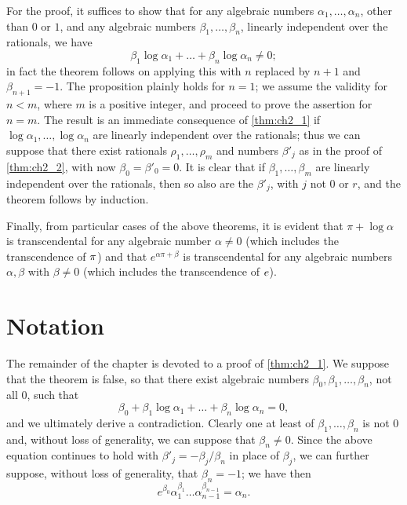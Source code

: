 For the proof, it suffices to show that for any algebraic numbers $\alpha_1, \dots, \alpha_n$, other than $0$ or $1$, and any algebraic numbers $\beta_1, \dots, \beta_n$, linearly independent over the rationals, we have
\[
\beta_1 \log \alpha_1 + \dots + \beta_n \log \alpha_n \neq 0;
\]
in fact the theorem follows on applying this with $n$ replaced by $n+1$ and $\beta_{n+1}=-1$. The proposition plainly holds for $n=1$; we assume the validity for $n < m$, where $m$ is a positive integer, and proceed to prove the assertion for $n=m$. The result is an immediate consequence of \autoref{thm:ch2_1} if $\log \alpha_1, \dots, \log \alpha_n$ are linearly independent over the rationals; thus we can suppose that there exist rationals $\rho_1, \dots, \rho_m$ and numbers $\beta'_j$ as in the proof of \autoref{thm:ch2_2}, with now $\beta_0 = \beta'_0 = 0$. It is clear that if $\beta_1, \dots, \beta_m$ are linearly independent over the rationals, then so also are the $\beta'_j$, with $j$ not $0$ or $r$, and the theorem follows by induction.

Finally, from particular cases of the above theorems, it is evident that $\pi + \log \alpha$ is transcendental for any algebraic number $\alpha \neq 0$ (which includes the transcendence of $\pi\index{transcendence of  $\pi$}$) and that $e^{\alpha\pi+\beta}$ is transcendental for any algebraic numbers $\alpha, \beta$ with $\beta \neq 0$ (which includes the transcendence of $e\index{transcendence of e}$).

\section{Notation}

The remainder of the chapter is devoted to a proof of \autoref{thm:ch2_1}. We suppose that the theorem is false, so that there exist algebraic numbers $\beta_0, \beta_1, \dots, \beta_n$, not all $0$, such that
\[
\beta_0 + \beta_1 \log \alpha_1 + \dots + \beta_n \log \alpha_n = 0,
\]
and we ultimately derive a contradiction. Clearly one at least of $\beta_1, \dots, \beta_n$ is not $0$ and, without loss of generality, we can suppose that $\beta_n \neq 0$. Since the above equation continues to hold with $\beta'_j = -\beta_j/\beta_n$ in place of $\beta_j$, we can further suppose, without loss of generality, that $\beta_n = -1$; we have then
\begin{equation} \label{eq:ch2_1}\tag{1}
e^{\beta_0}\alpha_1^{\beta_1}\dots\alpha_{n-1}^{\beta_{n-1}}=\alpha_n.
\end{equation}

